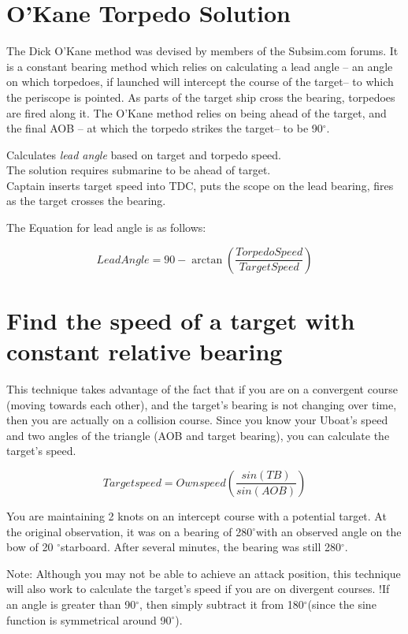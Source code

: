 \documentclass{article}
\newcommand{\degree}{$^{\circ}$}
\begin{document}
\section{O'Kane Torpedo Solution}
The Dick O'Kane method was devised by members of the Subsim.com forums. It is a constant bearing method which relies on calculating a lead angle -- an angle on which torpedoes, if launched will intercept the course of the target-- to which the periscope is pointed. As parts of the target ship cross the bearing, torpedoes are fired along it. The O'Kane method relies on being ahead of the target, and the final AOB -- at which the torpedo strikes the target-- to be 90\degree .

Calculates \emph{lead angle} based on target and torpedo speed.\\
The solution requires submarine to be ahead of target.\\
Captain inserts target speed into TDC, puts the scope on the lead bearing, fires as the target crosses the bearing.

The Equation for lead angle is as follows:

$$ LeadAngle = 90 - \arctan\left( \frac{Torpedo Speed}{TargetSpeed} \right) $$

\section{Find the speed of a target with constant relative bearing}

This technique takes advantage of the fact that if you are on a convergent course (moving towards each other), and the target’s bearing is not changing over time, then you are actually on a collision course. Since you know your Uboat’s speed and two angles of the triangle (AOB and target bearing), you can calculate the target’s speed.

$$Target speed = Own speed \left( \frac{sin(TB)}{sin (AOB)} \right)$$

You are maintaining 2 knots on an intercept course with a potential target. At the original observation, it was on a bearing of 280\degree with an observed angle on the bow of 20 \degree starboard. After several minutes, the bearing was still 280\degree.

Note: Although you may not be able to achieve an attack position, this technique will also work to calculate the target’s speed if you are on divergent courses. !If an angle is greater than 90\degree, then simply subtract it from 180\degree (since the sine function is symmetrical around 90\degree).
\end{document}
